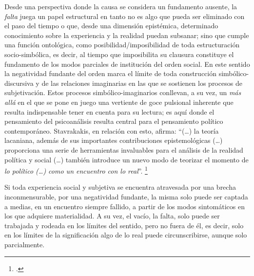 Desde una perspectiva donde la causa se considera un fundamento ausente, la \emph{falta} juega un papel estructural en tanto no es algo que pueda ser eliminado con el paso del tiempo o que, desde una dimensión epistémica, determinado conocimiento sobre la experiencia y la realidad puedan subsanar; sino que cumple una función ontológica, como posibilidad/imposibilidad de toda estructuración socio-simbólica, es decir, al tiempo que imposibilita su clausura constituye el fundamento de los modos parciales de institución del orden social. En este sentido la negatividad fundante del orden marca el límite de toda construcción simbólico-discursiva y de las relaciones imaginarias en las que se sostienen los procesos de subjetivación. Estos procesos simbólico-imaginarios conllevan, a su vez, un \emph{más allá} en el que se pone en juego una vertiente de goce pulsional inherente que resulta indispensable tener en cuenta para su lectura; es aquí donde el pensamiento del psicoanálisis resulta central para el pensamiento político contemporáneo. Stavrakakis, en relación con esto, afirma: \enquote{(\ldots) la teoría lacaniana, además de sus importantes contribuciones epistemológicas (\ldots) proporciona una serie de herramientas invaluables para el análisis de la realidad política y social (\ldots) también introduce un nuevo modo de teorizar el momento de \emph{lo político \emph{(\ldots)} como un encuentro con lo real}}. \footcite[][37]{@7003-STAVRAKAKIS2010}

Si toda experiencia social y subjetiva se encuentra atravesada por una brecha inconmensurable, por una negatividad fundante, la misma solo puede ser captada a medias, en un encuentro siempre fallido, a partir de los modos sintomáticos en los que adquiere materialidad. A su vez, el vacío, la falta, solo puede ser trabajada y rodeada en los límites del sentido, pero no fuera de él, es decir, solo en los límites de la significación algo de lo real puede circunscribirse, aunque solo parcialmente.

